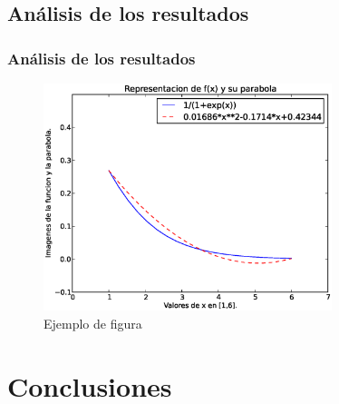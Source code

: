 \documentclass{beamer}
\begin{document}
\subsection{Análisis de los resultados}
\begin{frame}
\frametitle{Análisis de los resultados}

\begin{figure}[!th]
\begin{center}
\includegraphics[width=0.75\textwidth]{img/rep_funcion.eps}
\caption{Ejemplo de figura}
\label{fig:1}
\end{center}
\end{figure}

\end{frame}


\section{Conclusiones}
\end{document}
